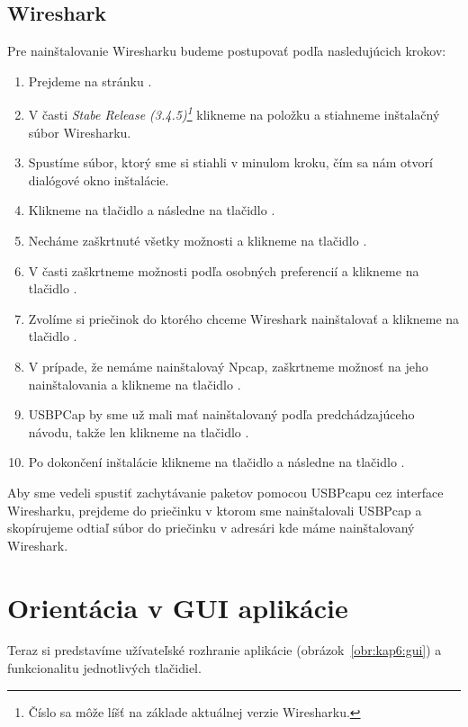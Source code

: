 \subsection{Wireshark}
Pre nainštalovanie Wiresharku budeme postupovať podľa nasledujúcich krokov:
\begin{enumerate}
\item Prejdeme na stránku .
\item V časti \textit{Stabe Release (3.4.5)\footnote{Číslo sa môže líšť na základe aktuálnej verzie Wiresharku.}} klikneme na položku  a stiahneme inštalačný súbor Wiresharku.
\item Spustíme súbor, ktorý sme si stiahli v minulom kroku, čím sa nám otvorí dialógové okno inštalácie.
\item Klikneme na tlačidlo  a následne na tlačidlo .
\item Necháme zaškrtnuté všetky možnosti a klikneme na tlačidlo .
\item V časti  zaškrtneme možnosti podľa osobných preferencií a klikneme na tlačidlo .
\item Zvolíme si priečinok do ktorého chceme Wireshark nainštalovať a klikneme na tlačidlo .
\item V prípade, že nemáme nainštalovaý Npcap, zaškrtneme možnosť na jeho nainštalovania a klikneme na tlačidlo .
\item USBPCap by sme už mali mať nainštalovaný podľa predchádzajúceho návodu, takže len klikneme na tlačidlo .
\item Po dokončení inštalácie klikneme na tlačidlo  a následne na tlačidlo .
\end{enumerate}

Aby sme vedeli spustiť zachytávanie paketov pomocou USBPcapu cez interface Wiresharku, prejdeme do priečinku v ktorom sme nainštalovali USBPcap a skopírujeme odtiaľ súbor  do priečinku  v adresári kde máme nainštalovaný Wireshark.



\section{Orientácia v GUI aplikácie}
Teraz si predstavíme užívateľské rozhranie aplikácie (obrázok~\ref{obr:kap6:gui}) a funk\-cionalitu jednotlivých tlačidiel. 

